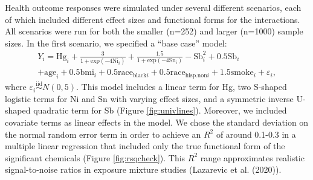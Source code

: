 \documentclass[12pt, twoside]{amherstthesis}
\begin{document}
Health outcome responses were simulated under several different scenarios, each of which included different effect sizes and functional forms for the interactions. All scenarios were run for both the smaller (n=252) and larger (n=1000) sample sizes. In the first scenario, we specified a ``base case'' model:
\begin{multline*}
Y_i = \textrm{Hg}_i + \frac{3}{1+\textrm{exp}(-4\textrm{Ni}_i)} + \frac{1.5}{1+\textrm{exp}(-4\textrm{Sn}_i)} - \textrm{Sb}_i^2 + 0.5\textrm{Sb}_i\\
+ \textrm{age}_i + 0.5\textrm{bmi}_i + 0.5\textrm{race}_{\textrm{black}i} + 0.5\textrm{race}_{\textrm{hisp.non}i} + 1.5\textrm{smoke}_i + \varepsilon_i,
\end{multline*}
\noindent where \(\varepsilon_i \overset{\mathrm{iid}}{\sim} N(0,5)\). This model includes a linear term for Hg, two S-shaped logistic terms for Ni and Sn with varying effect sizes, and a symmetric inverse U-shaped quadratic term for Sb (Figure \ref{fig:univlines}). Moreover, we included covariate terms as linear effects in the model. We chose the standard deviation on the normal random error term in order to achieve an \(R^2\) of around 0.1-0.3 in a multiple linear regression that included only the true functional form of the significant chemicals (Figure \ref{fig:rsqcheck}). This \(R^2\) range approximates realistic signal-to-noise ratios in exposure mixture studies (Lazarevic et al. (2020)).
\end{document}
